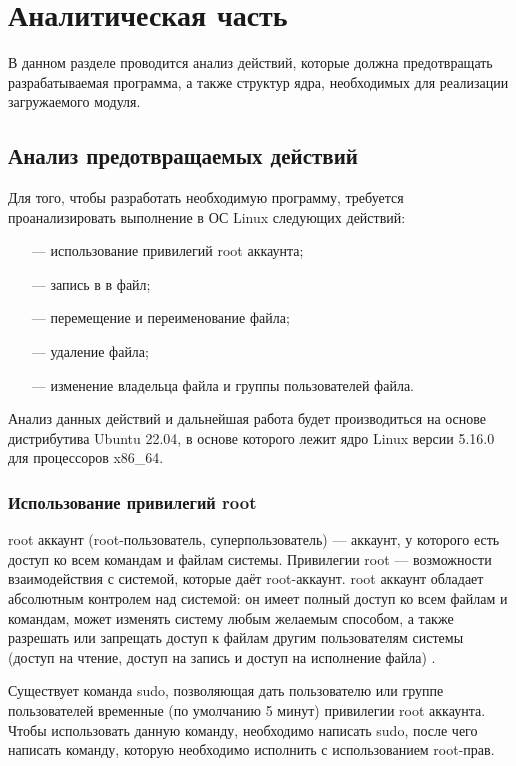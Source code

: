 \section{\large Аналитическая часть}

В данном разделе проводится анализ действий, которые должна предотвращать разрабатываемая программа, а также структур ядра, необходимых для реализации загружаемого модуля.

\subsection{Анализ предотвращаемых действий}

Для того, чтобы разработать необходимую программу, требуется проанализировать выполнение в ОС Linux следующих действий:
\begin{itemize}[leftmargin=1.6\parindent]
	\item[---] использование привилегий root аккаунта;
	\item[---] запись в в файл; 
	\item[---] перемещение и переименование файла;
	\item[---] удаление файла;
	\item[---] изменение владельца файла и группы пользователей файла.
\end{itemize}

Анализ данных действий и дальнейшая работа будет производиться на основе дистрибутива Ubuntu 22.04, в основе которого лежит ядро Linux версии 5.16.0 для процессоров x86\_64.

\subsubsection{Использование привилегий root}

root аккаунт (root-пользователь, суперпользователь) --- аккаунт, у которого есть доступ ко всем командам и файлам системы.  Привилегии root --- возможности взаимодействия с системой, которые даёт root-аккаунт. root аккаунт обладает абсолютным контролем над системой: он имеет полный доступ ко всем файлам и командам, может изменять систему любым желаемым способом, а также разрешать или запрещать доступ к файлам другим пользователям системы (доступ на чтение, доступ на запись и доступ на исполнение файла) \cite{root-definition}.

Существует команда sudo, позволяющая дать пользователю или группе пользователей временные (по умолчанию 5 минут) привилегии root аккаунта. Чтобы использовать данную команду, необходимо написать sudo, после чего написать команду, которую необходимо исполнить с использованием root-прав.

